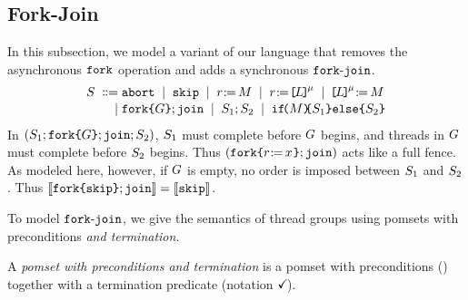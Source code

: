 
\subsection{Fork-Join}
\label{sec:join}

In this subsection, we model a variant of our language that removes the
asynchronous $\FORK{}$ operation and adds a synchronous $\FORKJOIN{}$.
\begin{align*}
  \aCmd
  \BNFDEF& \ABORT
  \BNFSEP \SKIP
  \BNFSEP \LET{\aReg}{\aExp}
  \BNFSEP \PRREF[\amode]{\cExp}{\aReg}
  \BNFSEP \PWREF[\amode]{\cExp}{\aExp}
  \\[-.5ex]
  \BNFSEP& \FORKJOIN{\aGrp}
  \BNFSEP \aCmd_1 \SEMI \aCmd_2
  \BNFSEP \IF{\aExp} \THEN \aCmd_1 \ELSE \aCmd_2 \FI
\end{align*}
In $\PBR{\aCmd_1\SEMI\FORKJOIN{\aGrp}\SEMI\aCmd_2}$, ${S_1}$ must
complete before ${G}$ begins, and threads in ${G}$ must complete
before ${S_2}$ begins.  Thus $\PBR{\FORKJOIN{\THREAD{\PR{x}{r}}}}$ acts
like a full fence.
% 
As modeled here, however, if $G$ is empty, no order is imposed between
${S_1}$ and ${S_2}$.  Thus
$\sem{\FORKJOIN{\THREAD{\SKIP}}}=\sem{\SKIP}$.

To model $\FORKJOIN{}$, we give the semantics of thread groups using pomsets
with preconditions \emph{and termination}.
\begin{definition}
  \label{def:pomsets-term}
  A \emph{pomset with preconditions and termination} is a pomset with
  preconditions () together with a termination
  predicate (notation $\checkmark\!$).
\end{definition}





